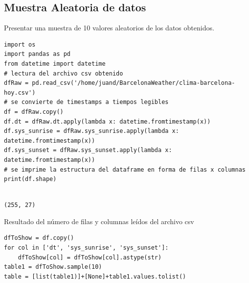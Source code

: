 \documentclass[11pt]{article}
\begin{document}
\subsection{Muestra Aleatoria de datos}
\label{sec:org1f53323}
Presentar una muestra de 10 valores aleatorios de los datos obtenidos.
\begin{verbatim}
import os
import pandas as pd
from datetime import datetime
# lectura del archivo csv obtenido
dfRaw = pd.read_csv('/home/juand/BarcelonaWeather/clima-barcelona-hoy.csv')
# se convierte de timestamps a tiempos legibles
df = dfRaw.copy()
df.dt = dfRaw.dt.apply(lambda x: datetime.fromtimestamp(x))
df.sys_sunrise = dfRaw.sys_sunrise.apply(lambda x: datetime.fromtimestamp(x))
df.sys_sunset = dfRaw.sys_sunset.apply(lambda x: datetime.fromtimestamp(x))
# se imprime la estructura del dataframe en forma de filas x columnas
print(df.shape)


\end{verbatim}
\label{org5928fcc}
\begin{verbatim}
(255, 27)
\end{verbatim}


Resultado del número de filas y columnas leídos del archivo csv

\begin{verbatim}
dfToShow = df.copy()
for col in ['dt', 'sys_sunrise', 'sys_sunset']:
    dfToShow[col] = dfToShow[col].astype(str)
table1 = dfToShow.sample(10)
table = [list(table1)]+[None]+table1.values.tolist()
\end{verbatim}
\end{document}
